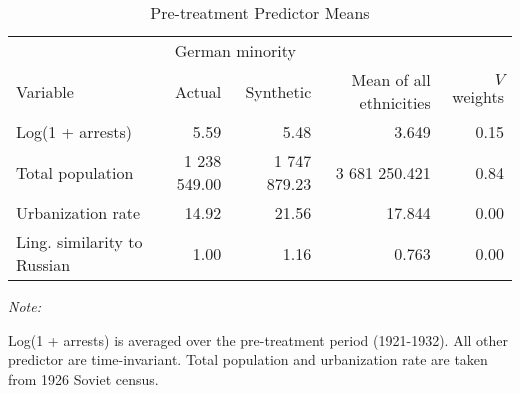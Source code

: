 \begin{table}[!h]

\caption{\label{tab:sc_predictor_means_robustness}Pre-treatment Predictor Means}
\centering
\begin{threeparttable}
\fontsize{10}{12}\selectfont
\begin{tabular}{lrrrr}
\toprule
\multicolumn{1}{c}{ } & \multicolumn{2}{c}{German minority} \\
\cmidrule(l{2pt}r{2pt}){2-3}
Variable & Actual & Synthetic & Mean of all ethnicities & $V$ weights\\
\midrule
Log(1 + arrests) & 5.59 & 5.48 & 3.649 & 0.15\\
Total population & 1 238 549.00 & 1 747 879.23 & 3 681 250.421 & 0.84\\
Urbanization rate & 14.92 & 21.56 & 17.844 & 0.00\\
Ling. similarity to Russian & 1.00 & 1.16 & 0.763 & 0.00\\
\bottomrule
\end{tabular}
\begin{tablenotes}
\item \textit{Note: } 
\item Log(1 + arrests) is averaged over the pre-treatment period (1921-1932). All other predictor are time-invariant. Total population and urbanization rate are taken from 1926 Soviet census.
\end{tablenotes}
\end{threeparttable}
\end{table}